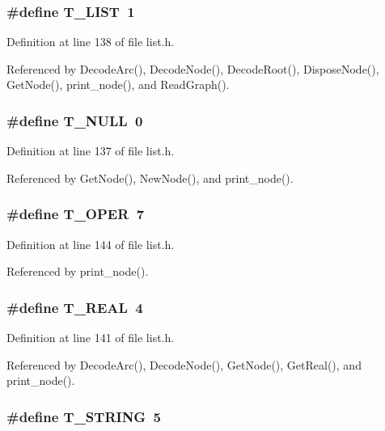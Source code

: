 \subsubsection{\setlength{\rightskip}{0pt plus 5cm}\#define T\_\-LIST~1}\label{list_8h_7e2cd8b10eb143f185230ce3fe8d8336}




Definition at line 138 of file list.h.

Referenced by Decode\-Arc(), Decode\-Node(), Decode\-Root(), Dispose\-Node(), Get\-Node(), print\_\-node(), and Read\-Graph().
\subsubsection{\setlength{\rightskip}{0pt plus 5cm}\#define T\_\-NULL~0}\label{list_8h_fb8e7ff3357caa8dd3252695cefece51}




Definition at line 137 of file list.h.

Referenced by Get\-Node(), New\-Node(), and print\_\-node().
\subsubsection{\setlength{\rightskip}{0pt plus 5cm}\#define T\_\-OPER~7}\label{list_8h_781906d477b5f57fccef442e0891149c}




Definition at line 144 of file list.h.

Referenced by print\_\-node().
\subsubsection{\setlength{\rightskip}{0pt plus 5cm}\#define T\_\-REAL~4}\label{list_8h_4ea52a0c619681fbd5432e835aa4124b}




Definition at line 141 of file list.h.

Referenced by Decode\-Arc(), Decode\-Node(), Get\-Node(), Get\-Real(), and print\_\-node().
\subsubsection{\setlength{\rightskip}{0pt plus 5cm}\#define T\_\-STRING~5}\label{list_8h_22a8c2a4bbaae9b68f65c9bb92fd4e39}




